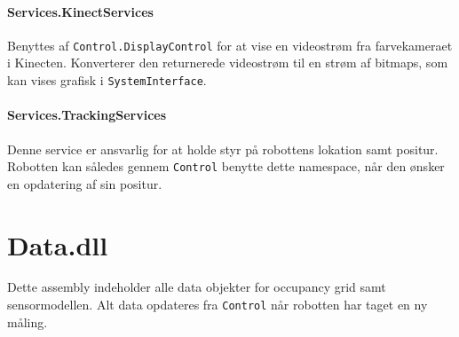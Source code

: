 \paragraph{Services.KinectServices}
Benyttes af \lstinline[style=csharp]!Control.DisplayControl! for at vise en videostrøm fra farvekameraet i Kinecten.
Konverterer den returnerede videostrøm til en strøm af bitmaps, som kan vises grafisk i \lstinline[style=csharp]!SystemInterface!.

\paragraph{Services.TrackingServices}
Denne service er ansvarlig for at holde styr på robottens lokation samt positur.
Robotten kan således gennem \lstinline[style=csharp]!Control! benytte dette namespace, når den ønsker en opdatering af sin positur.

\section{Data.dll}\label{arkitektur:data}
Dette assembly indeholder alle data objekter for occupancy grid samt sensormodellen.
Alt data opdateres fra \lstinline[style=csharp]!Control! når robotten har taget en ny måling.







